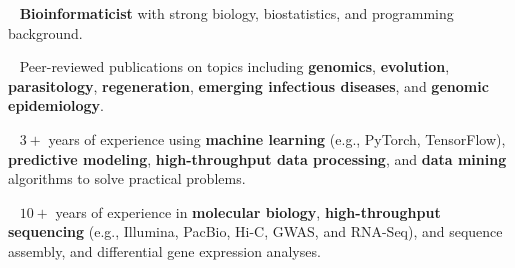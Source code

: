 \documentclass[11pt, letterpaper, sans]{moderncv}
\begin{document}
\thispagestyle{empty}\maketitle


\vspace{-3em}

\textbullet~ \textbf{Bioinformaticist} with strong biology, biostatistics, and programming background.

\textbullet~ Peer-reviewed publications on topics including \textbf{genomics}, \textbf{evolution}, \textbf{parasitology}, \textbf{regeneration}, \textbf{emerging infectious diseases}, and \textbf{genomic epidemiology}.

\textbullet~ $3+$ years of experience using \textbf{machine learning} (e.g., PyTorch, TensorFlow), \textbf{predictive modeling}, \textbf{high-throughput data processing}, and \textbf{data mining} algorithms to solve practical problems.

\textbullet~ $10+$ years of experience in \textbf{molecular biology}, \textbf{high-throughput sequencing} (e.g., Illumina, PacBio, Hi-C, GWAS, and RNA-Seq), and sequence assembly, and differential gene expression analyses.



\vspace{-0.5em}
\end{document}
